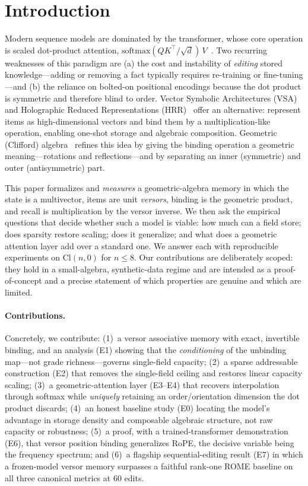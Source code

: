 \documentclass[10pt,twocolumn]{article}
\newcommand{\Cl}{\mathrm{Cl}}
\begin{document}
\section{Introduction}
Modern sequence models are dominated by the transformer, whose core operation is
scaled dot-product attention, $\mathrm{softmax}(QK^\top/\sqrt{d})\,V$~\cite{vaswani2017}. Two
recurring weaknesses of this paradigm are (a) the cost and instability of
\emph{editing} stored knowledge---adding or removing a fact typically requires
re-training or fine-tuning---and (b) the reliance on bolted-on positional
encodings because the dot product is symmetric and therefore blind to order.
Vector Symbolic Architectures (VSA) and Holographic Reduced Representations
(HRR)~\cite{plate1995,kanerva2009,smolensky1990,kleyko2022} offer an alternative:
represent items as high-dimensional vectors and bind them
by a multiplication-like operation, enabling one-shot storage and algebraic
composition. Geometric (Clifford) algebra~\cite{hestenes1984,dorst2007} refines
this idea by giving the binding
operation a geometric meaning---rotations and reflections---and by separating an
inner (symmetric) and outer (antisymmetric) part.

This paper formalizes and \emph{measures} a geometric-algebra memory in which
the state is a multivector, items are unit \emph{versors}, binding is the
geometric product, and recall is multiplication by the versor inverse. We then
ask the empirical questions that decide whether such a model is viable:
how much can a field store; does sparsity restore scaling; does it generalize;
and what does a geometric attention layer add over a standard one. We answer each
with reproducible experiments on $\Cl(n,0)$ for $n\le 8$. Our contributions are
deliberately scoped: they hold in a small-algebra, synthetic-data regime and are
intended as a proof-of-concept and a precise statement of which properties are
genuine and which are limited.

\paragraph{Contributions.} Concretely, we contribute:
(1)~a versor associative memory with exact, invertible binding, and an analysis
(E1) showing that the \emph{conditioning} of the unbinding map---not grade
richness---governs single-field capacity;
(2)~a sparse addressable construction (E2) that removes the single-field ceiling
and restores linear capacity scaling;
(3)~a geometric-attention layer (E3--E4) that recovers interpolation through
softmax while \emph{uniquely} retaining an order/orientation dimension the dot
product discards;
(4)~an honest baseline study (E0) locating the model's advantage in storage
density and composable algebraic structure, not raw capacity or robustness;
(5)~a proof, with a trained-transformer demonstration (E6), that versor position
binding generalizes RoPE, the decisive variable being the frequency spectrum;
and
(6)~a flagship sequential-editing result (E7) in which a frozen-model versor
memory surpasses a faithful rank-one ROME baseline on all three canonical
metrics at 60 edits.
\end{document}
